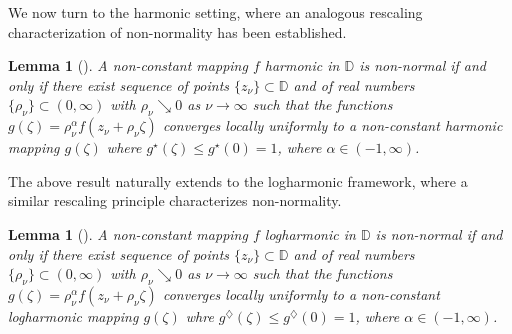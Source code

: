 \documentclass[11pt, reqno]{amsart}
\newtheorem{lemma}[theorem]{Lemma}
\theoremstyle{definition}
\theoremstyle{remark}
\numberwithin{equation}{section}
\begin{document}
We now turn to the harmonic setting, where an analogous rescaling characterization of non-normality has been established.
\begin{lemma}[{\cite[Theorem 1.2]{bharti-ronhapnhm-2025}}]\label{L-nnhm} 
A non-constant mapping $f$ harmonic in $\mathbb D$ is non-normal if and only if there exist sequence of
points $\{z_{\nu}\}\subset\mathbb D$ and of real numbers $\{\rho_{\nu} \}\subset(0,\infty)$ with 
$\rho_{\nu} \searrow 0$ as $\nu\to\infty$ such that the functions $g(\zeta)=\rho_{\nu} ^{\alpha}f(z_{\nu}+\rho_{\nu} \zeta)$ converges 
locally uniformly to a non-constant harmonic mapping $g(\zeta)$ where $g^{\star}(\zeta)\leq g^\star(0)=1$, where $\alpha\in(-1,\infty)$. 
\end{lemma}
The above result naturally extends to the logharmonic framework, where a similar rescaling principle characterizes non-normality.
\begin{lemma}[{\cite[Theorem 2.2]{ahamed-ncflm-2025}}] \label{L-nnlhm} 
A non-constant mapping $f$ logharmonic in $\mathbb D$ is non-normal if and only if there exist sequence of points $\{z_{\nu}\}\subset\mathbb D$ and of real 
numbers $\{\rho_{\nu} \}\subset(0,\infty)$ with $\rho_{\nu} \searrow 0$ as $\nu\to\infty$ such that the functions $g(\zeta)=\rho_{\nu} ^{\alpha}f(z_{\nu}+\rho_{\nu} \zeta)$ converges 
locally uniformly to a non-constant logharmonic mapping $g(\zeta)$ whre $g^{\diamondsuit}(\zeta)\leq g^\diamondsuit(0)=1$, where $\alpha\in(-1,\infty)$. 
\end{lemma}
\end{document}
